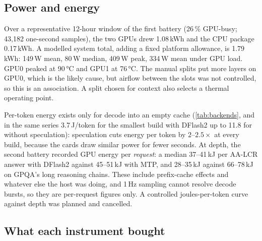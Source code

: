 \subsection{Power and energy}
Over a representative 12-hour window of the first battery (26\,\% GPU-busy; 43{,}182 one-second
samples), the two GPUs drew 1.08\,kWh and the CPU package 0.17\,kWh. A modelled system total, adding a
fixed platform allowance, is 1.79\,kWh: 149\,W mean, 80\,W median, 409\,W peak, 334\,W mean under GPU
load. GPU0 peaked at 90\,°C and GPU1 at 76\,°C. The manual splits put more layers on GPU0, which is the
likely cause, but airflow between the slots was not controlled, so this is an association. A split
chosen for context also selects a thermal operating point.

Per-token energy exists only for decode into an empty cache\hist{} (\cref{tab:backends}, and in the
same series 3.7\,J/token for the smallest build with DFlash2 up to 11.8 for \QsixXL{} without
speculation): speculation cuts energy per token by $2$--$2.5\times$ at every build, because the cards
draw similar power for fewer seconds. At depth, the second battery recorded GPU energy per
\emph{request}: a median 37--41\,kJ per AA-LCR answer with DFlash2 against 45--51\,kJ with MTP, and
28--35\,kJ against 66--78\,kJ on GPQA's long reasoning chains. These include prefix-cache effects and
whatever else the host was doing, and 1\,Hz sampling cannot resolve decode bursts, so they are
per-request figures only. A controlled joules-per-token curve against depth was planned and cancelled.

\subsection{What each instrument bought}\label{sec:cost}

